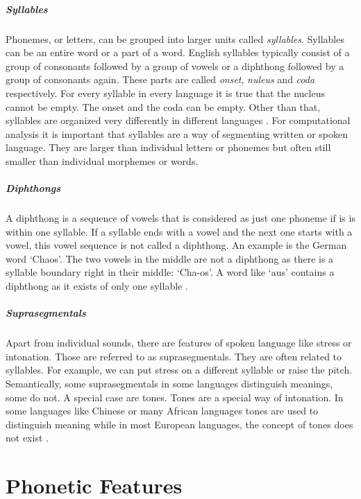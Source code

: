\subparagraph{Syllables} Phonemes, or letters, can be grouped into larger units called \textit{syllables}. Syllables can be an entire word or a part of a word. English syllables typically consist of a group of consonants followed by a group of vowels or a diphthong followed by a group of consonants again. These parts are called \textit{onset}, \textit{nuleus} and \textit{coda} respectively.  For every syllable in every language it is true that the nucleus cannot be empty. The onset and the coda can be empty. Other than that, syllables are organized very differently in different languages \citep{Intro.2007}. For computational analysis it is important that syllables are a way of segmenting written or spoken language. They are larger than individual letters or phonemes but often still smaller than individual morphemes or words. 

\subparagraph{Diphthongs}
A diphthong is a sequence of vowels that is considered as just one phoneme if is is within one syllable. If a syllable ends with a vowel and the next one starts with a vowel, this vowel sequence is not called a diphthong. An example is the German word `Chaos'. The two vowels in the middle are not a diphthong as there is a syllable boundary right in their middle: `Cha-os'. A word like `aus' contains a diphthong as it exists of only one syllable \citep{Intro.2007}. 

\subparagraph{Suprasegmentals} Apart from individual sounds, there are features of spoken language like stress or intonation. Those are referred to as suprasegmentals. They are often related to syllables. For example, we can put stress on a different syllable or raise the pitch. Semantically, some suprasegmentals in some languages distinguish meanings, some do not. A special case are tones. Tones are a special way of intonation. In some languages like Chinese or many African languages tones are used to distinguish meaning while in most European languages, the concept of tones does not exist \citep{Intro.2007}.

\section{Phonetic Features}


